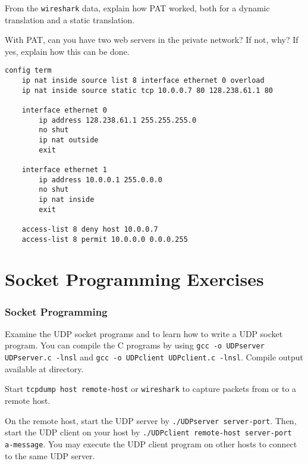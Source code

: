 \documentclass{../UTNetLab}
\begin{document}
    \begin{report}
    \item From the \lstinline{wireshark} data, explain how PAT worked, both for a dynamic translation and a static translation.
    
    \item With PAT, can you have two web servers in the private network?
    If not, why?
    If yes, explain how this can be done.
    \end{report}

    \begin{lstlisting}[language={cisco}, caption={PAT Router Configuration in Fig. 8.7}]
config term
    ip nat inside source list 8 interface ethernet 0 overload
    ip nat inside source static tcp 10.0.0.7 80 128.238.61.1 80

    interface ethernet 0
        ip address 128.238.61.1 255.255.255.0
        no shut
        ip nat outside
        exit

    interface ethernet 1
        ip address 10.0.0.1 255.0.0.0
        no shut
        ip nat inside
        exit

    access-list 8 deny host 10.0.0.7
    access-list 8 permit 10.0.0.0 0.0.0.255
    \end{lstlisting}

\part{Socket Programming Exercises}
\section{Socket Programming}
    Examine the UDP socket programs  and  to learn how to write a UDP socket program.
    You can compile the C programs by using \lstinline{gcc -o UDPserver UDPserver.c -lnsl} and \lstinline{gcc -o UDPclient UDPclient.c -lnsl}. Compile output available at  directory.

    Start \lstinline[emph={your-host, remote-host}]{tcpdump host remote-host} or \lstinline{wireshark} to capture packets from or to a remote host. 

    On the remote host, start the UDP server by \lstinline[emph={server-port}]{./UDPserver server-port}.
    Then, start the UDP client on your host by \lstinline[emph={your-host, remote-host, server-port, a-message}]{./UDPclient remote-host server-port a-message}.
    You may execute the UDP client program on other hosts to connect to the same UDP server.
\end{document}
